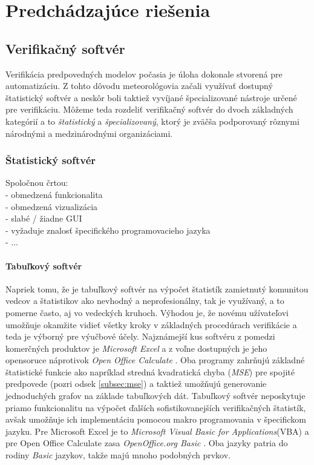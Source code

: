\chapter{Predchádzajúce riešenia}

\section{Verifikačný softvér}

Verifikácia predpovedných modelov počasia je úloha dokonale stvorená pre automatizáciu. 
Z tohto dôvodu meteorológovia začali využívať dostupný štatistický softvér 
a neskôr boli taktiež vyvíjané špecializované nástroje určené pre verifikáciu.
Môžeme teda rozdeliť verifikačný softvér do dvoch základných kategórií a to \textit{štatistický} a \textit{špecializovaný}, ktorý je zväčša podporovaný rôznymi národnými a medzinárodnými organizáciami.

\subsection{Štatistický softvér}
Spoločnou črtou: \\
	- obmedzená funkcionalita \\
	- obmedzená vizualizácia \\
	- slabé / žiadne GUI \\
	- vyžaduje znalosť špecifického programovacieho jazyka \\
	- ...


\subsubsection{Tabuľkový softvér}
Napriek tomu, že je tabuľkový softvér na výpočet štatistík zamietnutý komunitou vedcov a štatistikov ako nevhodný a neprofesionálny, tak je využívaný, a to pomerne často, aj vo vedeckých kruhoch. 
Výhodou je, že novému užívateľovi umožňuje okamžite vidieť všetky kroky v základných procedúrach verifikácie a teda je výborný pre výučbové účely. \cite{VerifSoft} 
Najznámejší kus softvéru z pomedzi komerčných produktov je \textit{Microsoft Excel} \cite{Excel} a z voľne dostupných je jeho opensoruce náprotivok \textit{Open Office Calculate} \cite{OpenOfficeCalc}. Oba programy zahrňujú základné štatistické funkcie ako napríklad stredná kvadratická chyba (\textit{MSE}) pre spojité predpovede (pozri odsek \ref{subsec:mse}) a taktiež umožňujú generovanie jednoduchých grafov na základe tabuľkových dát. Tabuľkový softvér neposkytuje priamo funkcionalitu na výpočet ďalších sofistikovanejších verifikačných štatistík, avšak umožňuje ich implementáciu pomocou makro programovania v špecifickom jazyku. Pre Microsoft Excel je to \textit{Microsoft Visual Basic for Applications}(VBA) \cite{VBA} a pre Open Office Calculate zasa \textit{OpenOffice.org Basic} \cite{OpenOfficeBasic}. Oba jazyky patria do rodiny \textit{Basic} jazykov, takže majú mnoho podobných prvkov.  


